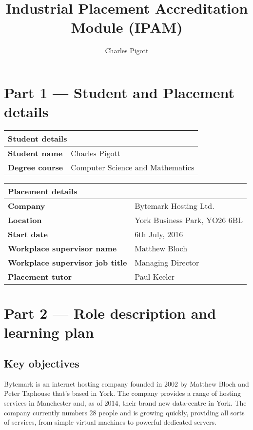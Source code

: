 \documentclass[12pt,a4paper]{article}
\title{Industrial Placement Accreditation Module (IPAM)}
\author{Charles Pigott}
\begin{document}
\maketitle

\section*{Part 1 --- Student and Placement details}

\noindent\begin{tabular}{ll}
	\multicolumn{2}{l}{\textbf{Student details}}              \\
	\toprule
	\textbf{Student name}  & Charles Pigott                   \\
	\midrule
	\textbf{Degree course} & Computer Science and Mathematics \\
	\bottomrule
\end{tabular}

\vspace{2em}

\noindent\begin{tabular}{ll}
	\multicolumn{2}{l}{\textbf{Placement details}}                         \\
	\toprule
	\textbf{Company}                        & Bytemark Hosting Ltd.        \\
	\midrule
	\textbf{Location}                       & York Business Park, YO26 6BL \\
	\midrule
	\textbf{Start date}                     & 6th July, 2016               \\
	\midrule
	\textbf{Workplace supervisor name}      & Matthew Bloch                \\
	\midrule
	\textbf{Workplace supervisor job title} & Managing Director            \\
	\midrule
	\textbf{Placement tutor}                & Paul Keeler                  \\
	\bottomrule
\end{tabular}

\section*{Part 2 --- Role description and learning plan}
\subsection*{Key objectives}
	Bytemark is an internet hosting company founded in 2002 by Matthew Bloch and
	Peter Taphouse that's based in York. The company provides a range of hosting
	services in Manchester and, as of 2014, their brand new data-centre in York.
	The company currently numbers 28 people and is growing quickly, providing
	all sorts of services, from simple virtual machines to powerful dedicated
	servers.
\end{document}
